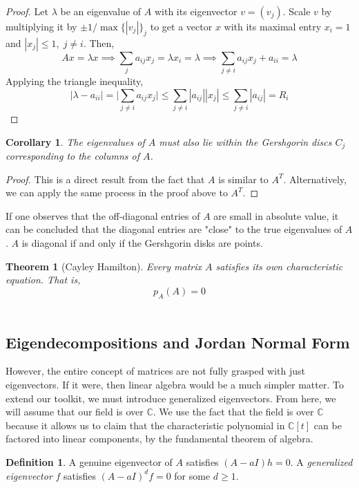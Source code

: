 \documentclass{article}
\newtheorem{theorem}{Theorem}[section]
\newtheorem{corollary}{Corollary}[theorem]
\theoremstyle{remark}
\theoremstyle{definition}
\newtheorem{definition}{Definition}[section]
\begin{document}
\begin{proof}
Let $\lambda$ be an eigenvalue of $A$ with its eigenvector $v = (v_j)$. Scale $v$ by multiplying it by $ \pm 1 / \max{\{|v_j|\}_j}$ to get a vector $x$ with its maximal entry $x_i = 1$ and $|x_j| \leq 1, \; j \neq i$. Then, 
\[A x = \lambda x \implies \sum_{j} a_{i j} x_j = \lambda x_i = \lambda \implies \sum_{j \neq i} a_{i j} x_j + a_{i i} = \lambda\]
Applying the triangle inequality, 
\[| \lambda - a_{i i} | = \bigg| \sum_{j \neq i} a_{i j} x_j\bigg| \leq \sum_{j \neq i} |a_{i j}| |x_j| \leq \sum_{j \neq i} |a_{i j}| = R_i\]
\end{proof}

\begin{corollary}
The eigenvalues of $A$ must also lie within the Gershgorin discs $C_j$ corresponding to the columns of $A$. 
\end{corollary}

\begin{proof}
This is a direct result from the fact that $A$ is similar to $A^T$. Alternatively, we can apply the same process in the proof above to $A^T$.
\end{proof} 

If one observes that the off-diagonal entries of $A$ are small in absolute value, it can be concluded that the diagonal entries are "close" to the true eigenvalues of $A$. $A$ is diagonal if and only if the Gershgorin disks are points. 

\begin{theorem}[Cayley Hamilton]
Every matrix $A$ satisfies its own characteristic equation. That is, 
\[ p_{A}(A) = 0\]\
\end{theorem} 

\subsection{Eigendecompositions and Jordan Normal Form}

However, the entire concept of matrices are not fully grasped with just eigenvectors. If it were, then linear algebra would be a much simpler matter. To extend our toolkit, we must introduce generalized eigenvectors. From here, we will assume that our field is over $\mathbb{C}$. We use the fact that the field is over $\mathbb{C}$ because it allows us to claim that the characteristic polynomial in $\mathbb{C}[t]$ can be factored into linear components, by the fundamental theorem of algebra. 

\begin{definition}
A genuine eigenvector of $A$ satisfies $(A-aI)h = 0$. A \textit{generalized eigenvector} $f$ satisfies $(A-a I)^{d} f = 0$ for some $d \geq 1$. 
\end{definition}
\end{document}
